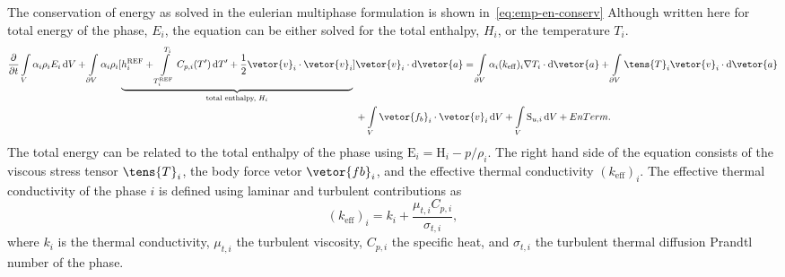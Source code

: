 The conservation of energy as solved in the eulerian multiphase formulation is shown in~\ref{eq:emp-en-conserv}
 Although written here for total energy of the phase, $E_{i}$, the equation can be either solved for the total
 enthalpy, $H_{i}$, or the temperature $T_{i}$. 
\begin{align}\label{eq:emp-en-conserv}
\frac{\partial}{\partial t}
\int\limits_{V} \alpha_{i} \rho_{i} E_{i} \,\mathrm{d}V
+ \int\limits_{\partial V} \alpha_{i} \rho_{i} 
[ 
    \underbrace{
        h_{i}^{\text{REF}} 
+ \int\limits_{T_{i}^{\text{REF}}}^{T_{i}} C_{p,i}(T') \,\mathrm{d}T' 
+ \frac{1}{2} \vetor{v}_{i} \cdot \vetor{v}_{i}
}_{\text{total enthalpy, $H_{i}$}}
]&
\vetor{v}_{i} \cdot \mathrm{d}\vetor{a} 
= \int\limits_{\partial V} \alpha_{i} (k_{\mathrm{eff}})_{i} \nabla T_{i} \cdot \mathrm{d}\vetor{a}
+ \int\limits_{\partial V} \tens{T}_{i} \vetor{v}_{i} \cdot \mathrm{d}\vetor{a}\nonumber \\
& + \int\limits_{V} \vetor{f_{b}}_{i} \cdot \vetor{v}_{i} \,\mathrm{d}V
+ \int\limits_{V} \mathrm{S}_{u,i} \,\mathrm{d}V + EnTerm.
\end{align}
The total energy can be related to the total enthalpy of the phase using  $\mathrm{E}_{i} = \mathrm{H}_{i} - p/\rho_{i}$.
The right hand side of the equation consists of the viscous stress tensor $\tens{T}_{i}$,
 the body force vetor $\vetor{f{b}}_{i}$, and the effective thermal conductivity $(k_{\mathrm{eff}})_{i}$.
 The effective thermal conductivity of the phase $i$ is defined using laminar and turbulent 
 contributions as \[(k_{\mathrm{eff}})_{i} = k_{i} + \frac{\mu_{t,i} C_{p,i}}{\sigma_{t,i}},\]
 where $k_{i}$ is the thermal conductivity, $\mu_{t,i}$ the turbulent viscosity,
 $C_{p,i}$ the specific heat, and $\sigma_{t,i}$ the turbulent thermal diffusion Prandtl number of the phase.

